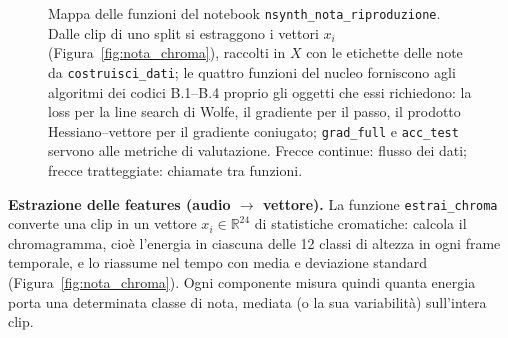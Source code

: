 \documentclass[a4paper,12pt]{article}
\numberwithin{equation}{section}
\numberwithin{figure}{section}
\numberwithin{table}{section}
\begin{document}
\begin{figure}[H]
{}
\caption{Mappa delle funzioni del notebook \texttt{nsynth\_nota\_riproduzione}.
Dalle clip di uno split si estraggono i vettori $x_i$ (Figura~\ref{fig:nota_chroma}),
raccolti in $X$ con le etichette delle note da \texttt{costruisci\_dati}; le quattro
funzioni del nucleo forniscono agli algoritmi dei codici B.1--B.4 proprio gli oggetti
che essi richiedono: la loss per la line search di Wolfe, il gradiente per il passo,
il prodotto Hessiano--vettore per il gradiente coniugato; \texttt{grad\_full} e
\texttt{acc\_test} servono alle metriche di valutazione. Frecce continue: flusso dei
dati; frecce tratteggiate: chiamate tra funzioni.}
\label{fig:nota_funzioni}
\end{figure}

\textbf{Estrazione delle features (audio $\to$ vettore).}
La funzione \texttt{estrai\_chroma} converte una clip in un vettore
$x_i \in \mathbb{R}^{24}$ di statistiche cromatiche: calcola il chromagramma,
cioè l'energia in ciascuna delle 12 classi di altezza in ogni frame temporale,
e lo riassume nel tempo con media e deviazione standard
(Figura~\ref{fig:nota_chroma}). Ogni componente misura quindi quanta energia
porta una determinata classe di nota, mediata (o la sua variabilità)
sull'intera clip.
\end{document}
